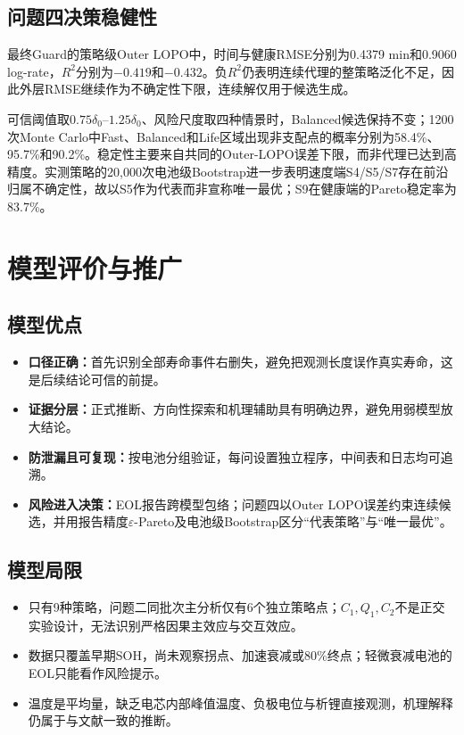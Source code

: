 \documentclass[withoutpreface]{cumcmthesis}
\begin{document}
\subsection{问题四决策稳健性}\label{sec:p4-sensitivity}
最终Guard的策略级Outer LOPO中，时间与健康RMSE分别为0.4379 min和0.9060 log-rate，$R^2$分别为$-0.419$和$-0.432$。负$R^2$仍表明连续代理的整策略泛化不足，因此外层RMSE继续作为不确定性下限，连续解仅用于候选生成。

可信阈值取$0.75\delta_0$--$1.25\delta_0$、风险尺度取四种情景时，Balanced候选保持不变；1200次Monte Carlo中Fast、Balanced和Life区域出现非支配点的概率分别为58.4\%、95.7\%和90.2\%。稳定性主要来自共同的Outer-LOPO误差下限，而非代理已达到高精度。实测策略的20,000次电池级Bootstrap进一步表明速度端S4/S5/S7存在前沿归属不确定性，故以S5作为代表而非宣称唯一最优；S9在健康端的Pareto稳定率为83.7\%。


\section{模型评价与推广}
\subsection{模型优点}
\begin{itemize}
  \item \textbf{口径正确：}首先识别全部寿命事件右删失，避免把观测长度误作真实寿命，这是后续结论可信的前提。
  \item \textbf{证据分层：}正式推断、方向性探索和机理辅助具有明确边界，避免用弱模型放大结论。
  \item \textbf{防泄漏且可复现：}按电池分组验证，每问设置独立程序，中间表和日志均可追溯。
  \item \textbf{风险进入决策：}EOL报告跨模型包络；问题四以Outer LOPO误差约束连续候选，并用报告精度$\varepsilon$-Pareto及电池级Bootstrap区分“代表策略”与“唯一最优”。
\end{itemize}

\subsection{模型局限}
\begin{itemize}
  \item 只有9种策略，问题二同批次主分析仅有6个独立策略点；$C_1,Q_1,C_2$不是正交实验设计，无法识别严格因果主效应与交互效应。
  \item 数据只覆盖早期SOH，尚未观察拐点、加速衰减或80\%终点；轻微衰减电池的EOL只能看作风险提示。
  \item 温度是平均量，缺乏电芯内部峰值温度、负极电位与析锂直接观测，机理解释仍属于与文献一致的推断。
\end{itemize}
\end{document}
